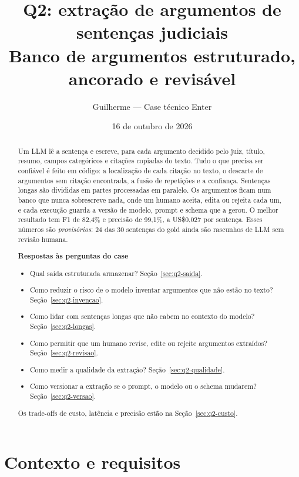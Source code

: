 \documentclass[11pt,a4paper]{article}
\title{Q2: extração de argumentos de sentenças judiciais\\[4pt]
\large Banco de argumentos estruturado, ancorado e revisável}
\author{Guilherme --- Case técnico Enter}
\date{16 de outubro de 2026}
\begin{document}
\maketitle

\begin{abstract}
\noindent
Um LLM lê a sentença e escreve, para cada argumento decidido pelo juiz, título, resumo, campos
categóricos e citações copiadas do texto. Tudo o que precisa ser confiável é feito em código: a
localização de cada citação no texto, o descarte de argumentos sem citação encontrada, a fusão
de repetições e a confiança. Sentenças longas são divididas em partes processadas em paralelo.
Os argumentos ficam num banco que nunca sobrescreve nada, onde um humano aceita, edita ou
rejeita cada um, e cada execução guarda a versão de modelo, prompt e schema que a gerou. O
melhor resultado tem F1 de 82,4\% e precisão de 99,1\%, a US\$0,027 por sentença. Esses números
são \emph{provisórios}: 24 das 30 sentenças do gold ainda são rascunhos de LLM sem revisão
humana.

\medskip\noindent
\textbf{Respostas às perguntas do case}
\begin{itemize}
  \item Qual saída estruturada armazenar? Seção~\ref{sec:q2-saida}.
  \item Como reduzir o risco de o modelo inventar argumentos que não estão no texto?
    Seção~\ref{sec:q2-invencao}.
  \item Como lidar com sentenças longas que não cabem no contexto do modelo?
    Seção~\ref{sec:q2-longas}.
  \item Como permitir que um humano revise, edite ou rejeite argumentos extraídos?
    Seção~\ref{sec:q2-revisao}.
  \item Como medir a qualidade da extração? Seção~\ref{sec:q2-qualidade}.
  \item Como versionar a extração se o prompt, o modelo ou o schema mudarem?
    Seção~\ref{sec:q2-versao}.
\end{itemize}
Os trade-offs de custo, latência e precisão estão na Seção~\ref{sec:q2-custo}.
\end{abstract}

\tableofcontents
\bigskip

\section{Contexto e requisitos}
\end{document}
